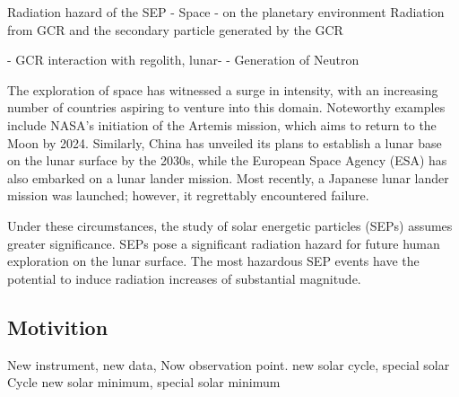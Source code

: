 Radiation hazard of the SEP 
- Space
- on the planetary environment
Radiation from GCR and the secondary particle generated by the GCR

- GCR interaction with regolith, lunar-
	- Generation of Neutron

The exploration of space has witnessed a surge in intensity, with an increasing number of countries aspiring to venture into this domain. Noteworthy examples include NASA's initiation of the Artemis mission, which aims to return to the Moon by 2024. Similarly, China has unveiled its plans to establish a lunar base on the lunar surface by the 2030s, while the European Space Agency (ESA) has also embarked on a lunar lander mission. Most recently, a Japanese lunar lander mission was launched; however, it regrettably encountered failure.

Under these circumstances, the study of solar energetic particles (SEPs) assumes greater significance. SEPs pose a significant radiation hazard for future human exploration on the lunar surface. The most hazardous SEP events have the potential to induce radiation increases of substantial magnitude.

\subsection{Motivition}
New instrument, new data, 
Now observation point.
new solar cycle, special solar Cycle
new solar minimum, special solar minimum
